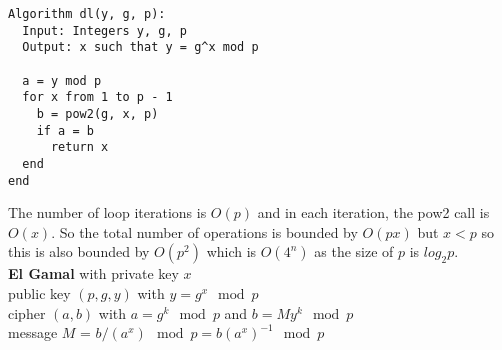 \documentclass[a4paper]{article}
\begin{document}
\begin{multicols}{2}
\begin{framed}
\begin{lstlisting}
Algorithm dl(y, g, p):
  Input: Integers y, g, p
  Output: x such that y = g^x mod p
	
  a = y mod p	
  for x from 1 to p - 1
    b = pow2(g, x, p)
    if a = b
      return x
  end
end
\end{lstlisting}

\noindent
The number of loop iterations is $O(p)$ and in each iteration, the pow2 call is $O(x)$. So the total number of operations is bounded by $O(px)$ but $x < p$ so this is also bounded by $O(p^2)$ which is $O(4^n)$ as the size of $p$ is $log_2p$.\\

\noindent
\textbf{El Gamal} with private key $x$\\ 
public key $(p, g, y)$ with $y = g^x \mod p$\\
cipher $(a, b)$ with $a = g^k \mod p$ and $b = My^k \mod p$\\
message $M$ = $b/(a^x) \mod p = b(a^x)^{-1} \mod p$
\end{framed}
\end{multicols}
\end{document}
